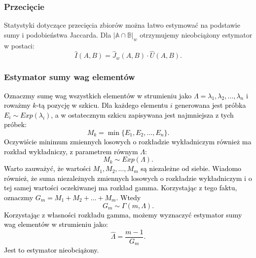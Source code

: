     \subsubsection*{Przecięcie}
    Statystyki dotyczące przecięcia zbiorów można łatwo estymować na podstawie sumy i podobieństwa Jaccarda. Dla $|\mathbb{A} \cap \mathbb{B}|_{w}$ otrzymujemy nieobciążony estymator w postaci:
    \[
        \hat{I}(A, B) = \hat{J}_w(A, B) \cdot \hat{U}(A, B).  
    \]
    \subsubsection*{Estymator sumy wag elementów}
    \label{sec:weight_sum_estimator}
    \textcolor{black}{Oznaczmy sumę wag wszystkich elementów w strumieniu jako $\Lambda = \lambda_1, \lambda_2, \dots, \lambda_n$ i roważmy $k$-tą pozycję w szkicu. Dla każdego elementu $i$ generowana jest próbka $E_i \sim Exp(\lambda_i)$, a w ostatecznym szkicu zapisywana jest najmniejsza z tych próbek: 
    \[
        M_k = \min{\{E_1, E_2, \dots, E_n\}}.
    \]
    Oczywiście minimum zmiennych losowych o rozkładzie wykładniczym również ma rozkład wykładniczy, z parametrem równym $\Lambda$:
    \[
        M_k \sim Exp(\Lambda).
    \]
    Warto zauważyć, że wartości $M_1, M_2, \dots, M_m$ są niezależne od siebie. Wiadomo również, że suma niezależnych zmiennych losowych o rozkładzie wykładniczym i o tej samej wartości oczekiwanej ma rozkład gamma. Korzystając z tego faktu, oznaczmy $G_m = M_1 + M_2 + \dots + M_m$. Wtedy 
    \[
        G_m \sim \Gamma(m, \Lambda).
    \]
    Korzystając z własności rozkładu gamma, możemy wyznaczyć estymator sumy wag elementów w strumieniu jako:
    \[
        \hat{\Lambda} = \frac{m - 1}{G_m}.
    \]
    Jest to estymator nieobciążony.
    }

